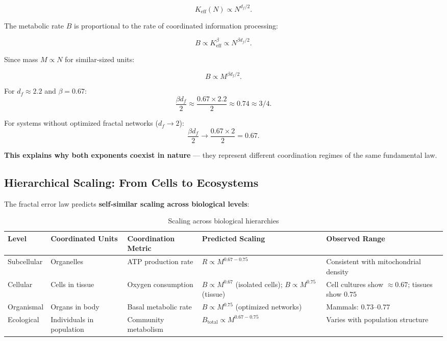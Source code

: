 \documentclass[12pt]{article}
\newcommand{\Keff}{K_{\mathrm{eff}}}
\begin{document}
	\begin{equation}
		\Keff(N) \propto N^{d_f/2}.
	\end{equation}
	
	The metabolic rate \(B\) is proportional to the rate of coordinated information processing:
	
	\begin{equation}
		B \propto \Keff^{\beta} \propto N^{\beta d_f/2}.
	\end{equation}
	
	Since mass \(M \propto N\) for similar‑sized units:
	
	\begin{equation}
		B \propto M^{\beta d_f/2}.
	\end{equation}
	
	For \(d_f \approx 2.2\) and \(\beta = 0.67\):
	\begin{equation}
		\frac{\beta d_f}{2} \approx \frac{0.67 \times 2.2}{2} \approx 0.74 \approx 3/4.
	\end{equation}
	
	For systems without optimized fractal networks (\(d_f \to 2\)):
	\begin{equation}
		\frac{\beta d_f}{2} \to \frac{0.67 \times 2}{2} = 0.67.
	\end{equation}
	
	\textbf{This explains why both exponents coexist in nature} — they represent different coordination regimes of the same fundamental law.
	
	\subsection{Hierarchical Scaling: From Cells to Ecosystems}
	
	The fractal error law predicts \textbf{self‑similar scaling across biological levels}:
	
	\begin{table}[htbp]
		\centering
		\caption{Scaling across biological hierarchies}
		\label{tab:hierarchical-scaling}
		\begin{tabular}{p{3cm} p{3cm} p{3.5cm} p{2.5cm} p{3cm}}
			\toprule
			\textbf{Level} & \textbf{Coordinated Units} & \textbf{Coordination Metric} & \textbf{Predicted Scaling} & \textbf{Observed Range} \\
			\midrule
			Subcellular & Organelles & ATP production rate & \(R \propto M^{0.67-0.75}\) & Consistent with mitochondrial density \cite{West2002} \\
			Cellular & Cells in tissue & Oxygen consumption & \(B \propto M^{0.67}\) (isolated cells); \(B \propto M^{0.75}\) (tissue) & Cell cultures show \(\approx 0.67\); tissues show \(0.75\) \cite{West2002} \\
			Organismal & Organs in body & Basal metabolic rate & \(B \propto M^{0.75}\) (optimized networks) & Mammals: \(0.73\)–\(0.77\) \cite{Kleiber1932} \\
			Ecological & Individuals in population & Community metabolism & \(B_{\text{total}} \propto M^{0.67-0.75}\) & Varies with population structure \cite{Glazier2005} \\
			\bottomrule
		\end{tabular}
	\end{table}
	
\end{document}
